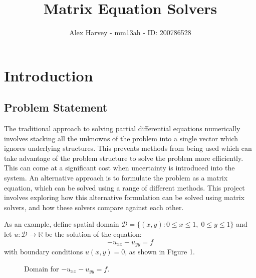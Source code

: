 \documentclass{article}
\title{Matrix Equation Solvers}
\author{Alex Harvey - mm13ah - ID: 200786528}
\date{}
\numberwithin{equation}{section}
\begin{document}
\maketitle

\newpage

\tableofcontents

\clearpage

\section{Introduction}
\subsection{Problem Statement}

The traditional approach to solving partial differential equations numerically involves stacking all the unknowns of the problem into a single vector which ignores underlying structures. This prevents methods from being used which can take advantage of the problem structure to solve the problem more efficiently. This can come at a significant cost when uncertainty is introduced into the system. An alternative approach is to formulate the problem as a matrix equation, which can be solved using a range of different methods. This project involves exploring how this alternative formulation can be solved using matrix solvers, and how these solvers compare against each other. 

As an example, define spatial domain $\mathcal{D} = \{(x,y) : 0 \leq x \leq 1, \; 0 \leq y \leq 1 \}$ and let $u: \mathcal{D} \to \mathbb{R}$ be the solution of the equation:
	\begin{equation} 
	-u_{xx} - u_{yy} = f
	\end{equation}
with boundary conditions $u(x,y)=0$, as shown in Figure 1.

\begin{figure}[H]
\centering
\caption{Domain for $-u_{xx}-u_{yy}=f$.}
\end{figure}
\end{document}
